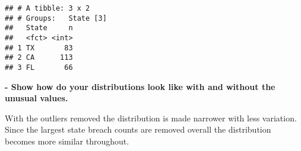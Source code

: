 \documentclass[
]{article}
\newenvironment{Shaded}{\begin{snugshade}}{\end{snugshade}}
\newcommand{\AttributeTok}[1]{\textcolor[rgb]{0.77,0.63,0.00}{#1}}
\newcommand{\ConstantTok}[1]{\textcolor[rgb]{0.00,0.00,0.00}{#1}}
\newcommand{\DecValTok}[1]{\textcolor[rgb]{0.00,0.00,0.81}{#1}}
\newcommand{\FloatTok}[1]{\textcolor[rgb]{0.00,0.00,0.81}{#1}}
\newcommand{\FunctionTok}[1]{\textcolor[rgb]{0.00,0.00,0.00}{#1}}
\newcommand{\NormalTok}[1]{#1}
\newcommand{\OtherTok}[1]{\textcolor[rgb]{0.56,0.35,0.01}{#1}}
\newcommand{\SpecialCharTok}[1]{\textcolor[rgb]{0.00,0.00,0.00}{#1}}
\begin{document}
\begin{Shaded}
\end{Shaded}

\begin{verbatim}
## # A tibble: 3 x 2
## # Groups:   State [3]
##   State     n
##   <fct> <int>
## 1 TX       83
## 2 CA      113
## 3 FL       66
\end{verbatim}

\textbf{- Show how do your distributions look like with and without the
unusual values.}

With the outliers removed the distribution is made narrower with less
variation. Since the largest state breach counts are removed overall the
distribution becomes more similar throughout.
\end{document}
